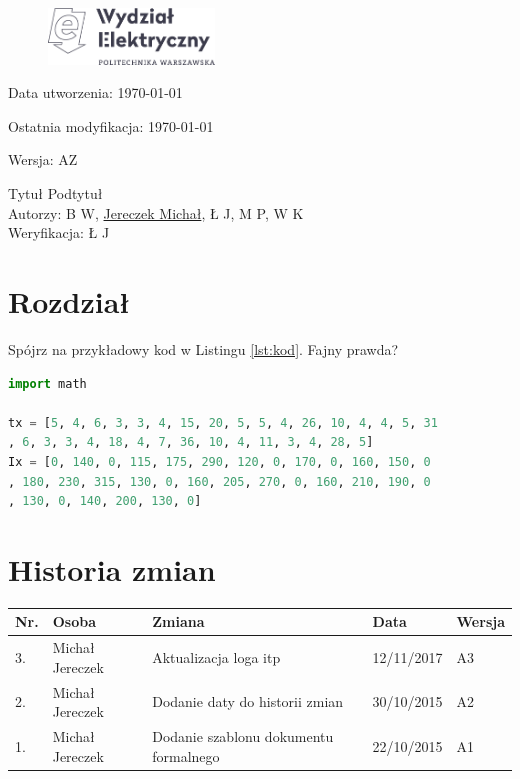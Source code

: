 \documentclass[a4paper, 12pt]{article}
\begin{document}
\begin{figure}
\includegraphics[height=1.5cm,keepaspectratio]{WE-znak.png}
\end{figure}

\hfill Data utworzenia: \today

\hfill Ostatnia modyfikacja: \today

\hfill Wersja: AZ %


\quad
\begin{center}
\center \Huge Tytuł
\center \large Podtytuł
\vspace{0.5cm}\\
\small Autorzy: B W, \underline{Jereczek Michał}, Ł J, M P, W K
\vspace{0.1cm}\\
\small Weryfikacja: Ł J
\end{center}

\tableofcontents
\pagebreak

\section{Rozdział}
Spójrz na przykładowy kod w Listingu \ref{lst:kod}. Fajny prawda?

\begin{lstlisting}[language=Python,frame=single,caption=Skrypt obliczający obciążenie cieplne oraz moment znamionowy,label={lst:kod},   showstringspaces=false]
import math

tx = [5, 4, 6, 3, 3, 4, 15, 20, 5, 5, 4, 26, 10, 4, 4, 5, 31
, 6, 3, 3, 4, 18, 4, 7, 36, 10, 4, 11, 3, 4, 28, 5]
Ix = [0, 140, 0, 115, 175, 290, 120, 0, 170, 0, 160, 150, 0
, 180, 230, 315, 130, 0, 160, 205, 270, 0, 160, 210, 190, 0
, 130, 0, 140, 200, 130, 0]


\end{lstlisting}


\pagebreak
\section{Historia zmian}
\begin{center}
    \begin{tabular}{ | p{0.5cm} | p{4.5cm} | p{6cm} | p{2cm} |p{1.2cm} |}
    \hline
    Nr. & Osoba & Zmiana & Data & Wersja 
    \\ \hline
    3. & Michał Jereczek & Aktualizacja loga itp & 12/11/2017  & A3
    \\ \hline
    2. & Michał Jereczek & Dodanie daty do historii zmian & 30/10/2015  & A2
    \\ \hline
    1. & Michał Jereczek & Dodanie szablonu dokumentu formalnego & 22/10/2015  & A1
    \\ \hline
    \end{tabular}
\end{center}
\end{document}
